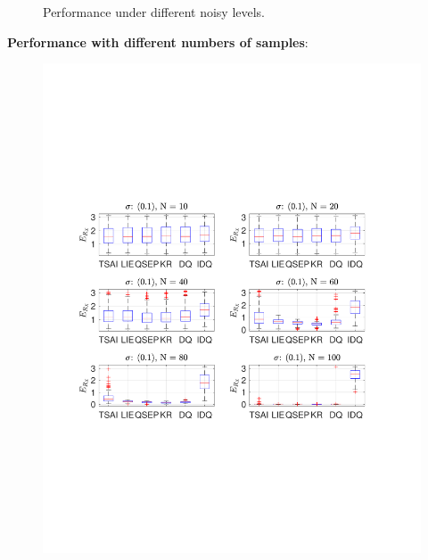 \documentclass[a4paper]{report}
\begin{document}
\begin{figure}
\caption{Performance under different noisy levels.}
\end{figure}

\textbf{Performance with different numbers of samples}:
\begin{figure}
\centering
\includegraphics[scale=0.6]{./hand_eye_figures/conv/conv_r_err_cmp1}

\end{figure}
\end{document}
